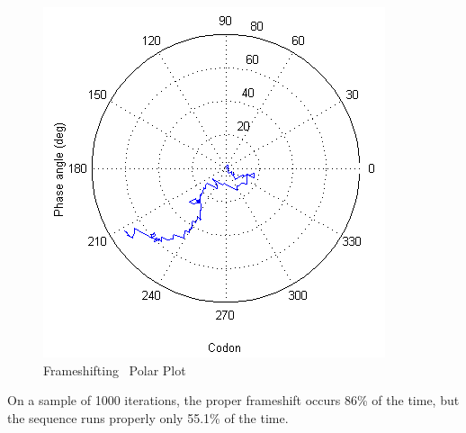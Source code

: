 \documentclass[10pt,twocolumn,draft]{article}
\begin{document}
\begin{figure}[htp]
    \centering
    \caption{Frameshifting \rpoS\ Polar Plot}
    \label{rposfs:polar}
    \includegraphics[scale=0.7]{rpoS/frameshift-polar.png}
\end{figure}

On a sample of 1000 iterations, the proper frameshift occurs 86\% of the time, but the sequence runs properly only 55.1\% of the time.
\end{document}
